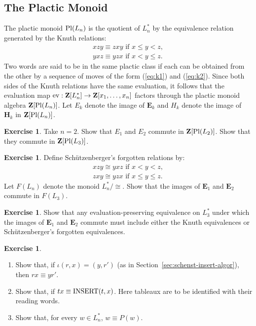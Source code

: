 \documentclass[11pt]{amsproc}
\theoremstyle{definition}
\theoremstyle{example}
\newtheorem{exercise}[theorem]{Exercise}
\newcommand{\ev}{\textup{ev}}
\newcommand{\ins}{\textup{INSERT}}
\newcommand{\pl}{\textup{Pl}}
\begin{document}
\subsection{The Plactic Monoid}
\label{sec:plactic-monoid}
The plactic monoid $\pl(L_n)$ is the quotient of $L^*_n$ by the equivalence relation generated by the Knuth relations:
\begin{gather}
  \tag{$K1$}\label{eq:k1}
  xzy \equiv zxy \text{ if } x\leq y < z,
  \\
  \tag{$K2$}\label{eq:k2}
  yxz \equiv yzx \text{ if } x < y \leq z.
\end{gather}
Two words are said to be in the same plactic class if each can be obtained from the other by a sequence of moves of the form (\ref{eq:k1}) and (\ref{eq:k2}).
Since both sides of the Knuth relations have the same evaluation, it follows that the evaluation map $\ev:\mathbf Z[L^*_n]\to \mathbf Z[x_1,\dotsc,x_n]$ factors through the plactic monoid algebra $\mathbf Z[\pl(L_n)]$.
Let $E_k$ denote the image of $\mathbf E_k$ and $H_k$ denote the image of $\mathbf H_k$ in $\mathbf Z[\pl(L_n)]$.
\begin{exercise}
  Take $n=2$.
  Show that $E_1$ and $E_2$ commute in $\mathbf Z[\pl(L_2)]$.
  Show that they commute in $\mathbf Z[\pl(L_3)]$.
\end{exercise}
\begin{exercise}
  \label{exercise:forgotten}
  Define Sch\"utzenberger's forgotten relations by:
  \begin{gather}
    \tag{$F1$}\label{eq:f1}
    xzy \cong yxz \text{ if } x < y < z,
    \\
    \tag{$F2$}\label{eq:f2}
    zxy \cong yzx \text{ if } x \leq y \leq z.
  \end{gather}
  Let $F(L_n)$ denote the monoid $L_n^*/\cong$.
  Show that the images of $\mathbf E_1$ and $\mathbf E_2$ commute in $F(L_3)$.
\end{exercise}
\begin{exercise}
  Show that any evaluation-preserving equivalence on $L_3^*$ under which the images of $\mathbf E_1$ and $\mathbf E_2$ commute must include either the Knuth equivalences or Sch\"utzenberger's forgotten equivalences.
\end{exercise}
\begin{exercise}
  \begin{enumerate}
  \item Show that, if $\iota(r,x)=(y,r')$ (as in Section~\ref{sec:schenst-insert-algor}), then $rx\equiv yr'$.
  \item Show that, if $tx\equiv \ins(t,x)$. Here tableaux are to be identified with their reading words.
  \item Show that, for every $w\in L_n^*$, $w\equiv P(w)$.
  \end{enumerate}
\end{exercise}
\end{document}
